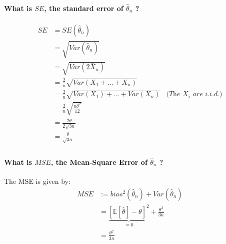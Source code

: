 \documentclass{article}
\newcommand{\E}{\mathbb{E}}
\newcommand{\thetahat}{\hat\theta}
\begin{document}
\paragraph{What is \(SE\), the standard error of \(\hat\theta_n\) ?\\}

\begin{align*}
    SE
     & = SE(\thetahat_n)                                                                                                         \\
     & = \sqrt{Var(\thetahat_n)}                                                                                                 \\
     & = \sqrt{Var(2\bar{X}_n)}                                                                                                  \\
     & = \frac{2}{n} \sqrt{Var \left( X_1 + \ldots + X_n \right)}                                                                \\
     & = \frac{2}{n} \sqrt{Var \left( X_1 \right) + \ldots +  Var \left( X_n \right)} & \textit{(The } X_i \textit{ are i.i.d.)} \\
     & = \frac{2}{n} \sqrt{\frac{n\theta^2}{12}}                                                                                 \\
     & = \frac{2 \theta}{2\sqrt{3n}}                                                                                             \\
     & = \frac{\theta}{\sqrt{3n}}                                                                                                \\
\end{align*}



\paragraph{What is \(MSE\), the Mean-Square Error of \(\hat\theta_n\) ?\\}
The MSE is given by:
\begin{align*}
    MSE
     & := bias^2 (\thetahat_n) + Var(\thetahat_n)                                        \\
     & = \underbrace{\left[ \E[\thetahat] - \theta \right]^2}_{=0} + \frac{\theta^2}{3n} \\
     & = \frac{\theta^2}{3n}                                                             \\
\end{align*}
\end{document}
